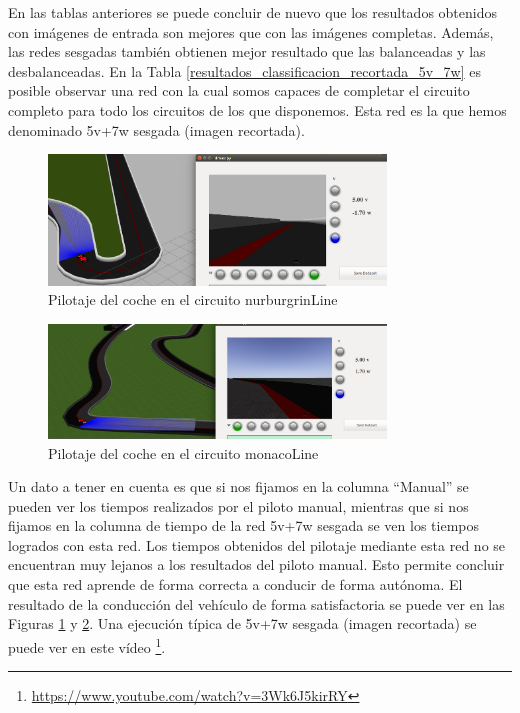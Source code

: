 En las tablas anteriores se puede concluir de nuevo que los resultados obtenidos con imágenes de entrada son mejores que con las imágenes completas. Además, las redes sesgadas también obtienen mejor resultado que las balanceadas y las desbalanceadas. En la Tabla \ref{resultados_classificacion_recortada_5v_7w} es posible observar una red con la cual somos capaces de completar el circuito completo para todo los circuitos de los que disponemos. Esta red es la que hemos denominado 5v+7w sesgada (imagen recortada). \\

\begin{figure}
\begin{center}
	\includegraphics[width=0.8\textwidth]{figures/Clasificacion/nurburgrin_class.png}
   \caption{Pilotaje del coche en el circuito nurburgrinLine}
	\label{fig.nurburgrin_class}
\end{center}
\end{figure}

\begin{figure}
\begin{center}
	\includegraphics[width=0.8\textwidth]{figures/Clasificacion/monaco_class.png}
   \caption{Pilotaje del coche en el circuito monacoLine}
	\label{fig.monaco_class}
\end{center}
\end{figure}

Un dato a tener en cuenta es que si nos fijamos en la columna ``Manual'' se pueden ver los tiempos realizados por el piloto manual, mientras que si nos fijamos en la columna de tiempo de la red 5v+7w sesgada se ven los tiempos logrados con esta red. Los tiempos obtenidos del pilotaje mediante esta red no se encuentran muy lejanos a los resultados del piloto manual. Esto permite concluir que esta red aprende de forma correcta a conducir de forma autónoma. El resultado de la conducción del vehículo de forma satisfactoria se puede ver en las Figuras \ref{fig.nurburgrin_class} y \ref{fig.monaco_class}. Una ejecución típica de 5v+7w sesgada (imagen recortada) se puede ver en este vídeo  \footnote{\url{https://www.youtube.com/watch?v=3Wk6J5kirRY}}.\\



